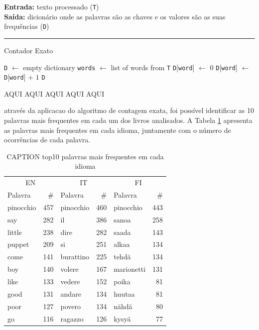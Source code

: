 \documentclass[mirror, portugues]{revdetua}
\begin{document}
\begin{algorithm}[H]
\raggedright
\textbf{Entrada:} texto processado (\texttt{T}) \\
\textbf{Saída:} dicionário onde as palavras são as chaves e os valores são as suas frequências (\texttt{D})\\
\hrule 
\caption{Contador Exato}
\begin{algorithmic}[1]
    \State \texttt{D} $\gets$ empty dictionary
    \State \texttt{words} $\gets$ list of words from \texttt{T}
            \State \texttt{D}[\texttt{word}] $\gets$ 0
        \EndIf
        \State \texttt{D}[\texttt{word}] $\gets$ \texttt{D}[\texttt{word}] + $1$
    \EndFor
    \State \Return \texttt{D}
\end{algorithmic}
\end{algorithm}
    
AQUI AQUI AQUI AQUI AQUI

através da aplicacao do algoritmo de contagem exata, foi possível identificar as 10 palavras mais frequentes em cada um dos livros analisados. A Tabela \ref{table:top10_exatos} apresenta as palavras mais frequentes em cada idioma, juntamente com o número de ocorrências de cada palavra.

\begin{table}[H]
\centering
\caption{CAPTION top10 palavras mais frequentes em cada idioma}
\label{table:top10_exatos}
\begin{tabular}{lr|lr|lr}
\toprule
\multicolumn{2}{c}{EN} & \multicolumn{2}{c}{IT} & \multicolumn{2}{c}{FI} \\
Palavra & \# & Palavra & \# & Palavra & \# \\
\midrule
pinocchio & 457 & pinocchio & 460 & pinocchio & 443 \\
say & 282 & il & 386 & sanoa & 258 \\
little & 238 & dire & 282 & saada & 143 \\
puppet & 209 & si & 251 & alkaa & 134 \\
come & 141 & burattino & 225 & tehdä & 134 \\
boy & 140 & volere & 167 & marionetti & 131 \\
like & 133 & vedere & 152 & poika & 81 \\
good & 131 & andare & 134 & huutaa & 81 \\
poor & 127 & povero & 134 & nähdä & 80 \\
go & 116 & ragazzo & 126 & kysyä & 77 \\
\bottomrule
\end{tabular}
\end{table}
\end{document}
